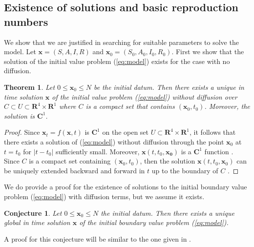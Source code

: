 \documentclass[11pt]{article}
\newcommand{\R}{\mathbf{R}}
\newcommand{\C}{\mathbf{C}}
\renewcommand\vec{\mathbf}
\newtheorem{theorem}{Theorem}
\newtheorem{conjecture}{Conjecture}
\begin{document}
	\subsection{Existence of solutions and basic reproduction numbers}
		We show that we are justified in searching for suitable parameters to solve the model.
		Let $\vec{x} = (S,  A, I, R)$ and $\vec{x}_0 = (S_0, A_0, I_0, R_0)$.
		First we show that the solution of the initial value problem (\ref{eq:model}) exists for the case with no diffusion.
		\begin{theorem}
			Let $0 \leq \vec{x}_0 \leq N$ be the initial datum.
			Then there exists a unique in time solution $\vec{x}$ of the initial value problem (\ref{eq:model}) without diffusion over $C \subset U \subset \R^4 \times \R^1$ where $C$ is a compact set that contains $(\vec{x}_0, t_0)$.
			Moreover, the solution is $\C^1$.
		\end{theorem}
		\begin{proof}
			Since $\vec{x}_t = f(\vec{x},t)$ is $\C^1$ on the open set $U \subset \R^4 \times \R^1$, it follows that there exists a solution of (\ref{eq:model}) without diffusion through the point $\vec{x}_0$ at $t = t_0$ for $|t - t_0|$ sufficiently small.
			Moreover, $\vec{x} (t, t_0,\vec{x_0})$ is a $\C^1$ function \cite{dynamics}.
			Since $C$ is a compact set containing $(\vec{x}_0, t_0)$, then the solution $\vec{x} (t, t_0, \vec{x}_0)$ can be uniquely extended backward and forward in $t$ up to the boundary of $C$ \cite{dynamics}.
		\end{proof}
		\noindent We do provide a proof for the existence of solutions to the initial boundary value problem (\ref{eq:model}) with diffusion terms, but we assume it exists.
		\begin{conjecture}
			Let $0 \leq \vec{x}_0 \leq N$ the initial datum.
			Then there exists a unique global in time solution $\vec{x}$ of the initial boundary value problem (\ref{eq:model}).
		\end{conjecture}
		\noindent A proof for this conjecture will be similar to the one given in \cite{Mammeri+2020+102+113}.
		
\end{document}
